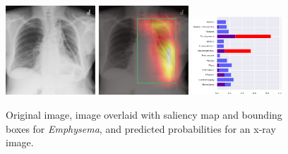 \documentclass[12pt,oneside,a4paper]{report}
\begin{document}
\begin{figure}[H]
  \centering
  \includegraphics[width=0.3\textwidth]{images/preds/emphysema}\hspace{0.01\textwidth}%
  \includegraphics[width=0.3\textwidth]{images/preds/emphysema_cam}\hspace{0.01\textwidth}%
  \includegraphics[width=0.3\textwidth]{images/preds/emphysema_probs}\\[0.01\textwidth]
  \caption{Original image, image overlaid with saliency map and bounding boxes
    for \emph{Emphysema}, and predicted probabilities for an x-ray image.}
  \label{examples_11}
\end{figure}
\end{document}
